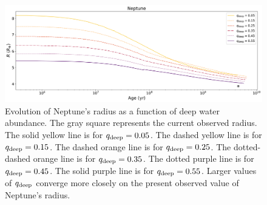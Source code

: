 \documentclass[11pt]{ucscthesisbs}
\begin{document}
\begin{figure}[ht]
 \centerline{
  \includegraphics[width=\columnwidth]{figures/n_cooling_radius_nz_4096_logx.png}
 }
\caption[Thermal Evolution Curves for Neptune - Radius]
{Evolution of Neptune's radius as a function of deep water abundance. The gray square represents the current observed radius. The solid yellow line is for $q_{\rm deep} = 0.05$. The dashed yellow line is for $q_{\rm deep} = 0.15$. The dashed orange line is for $q_{\rm deep} = 0.25$. The dotted-dashed orange line is for $q_{\rm deep} = 0.35$. The dotted purple line is for $q_{\rm deep} = 0.45$. The solid purple line is for $q_{\rm deep} = 0.55$. Larger values of $q_{\rm deep}$ converge more closely on the present observed value of Neptune's radius.}
\label{fig:evolve_neptune_radius}
\end{figure}
\end{document}
